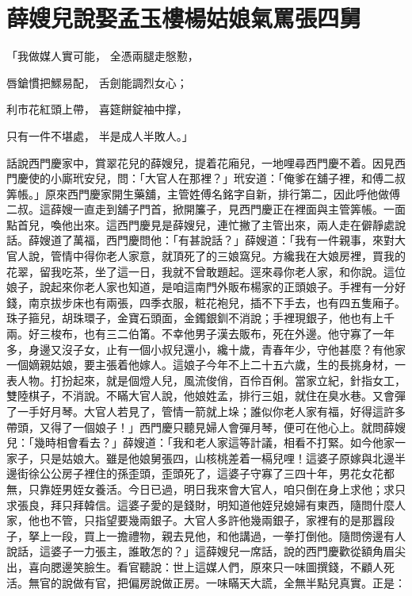 %

\chapter{薛嫂兒說娶孟玉樓\KG 楊姑娘氣罵張四舅}

「我做媒人實可能，  全憑兩腿走慇懃，

唇鎗慣把鰥易配，  舌劍能調烈女心；

利市花紅頭上帶，  喜筵餅錠袖中撑，

只有一件不堪處，  半是成人半敗人。」

話說西門慶家中，賞翠花兒的薛嫂兒，提着花廂兒，一地哩尋西門慶不着。因見西門慶使的小廝玳安兒，問：「大官人在那裡？」玳安道：「俺爹在舖子裡，和傅二叔筭帳。」原來西門慶家開生藥舖，主管姓傅名銘字自新，排行第二，因此呼他做傅二叔。這薛嫂一直走到舖子門首，掀開簾子，見西門慶正在裡面與主管筭帳。一面點首兒，喚他出來。這西門慶見是薛嫂兒，連忙撇了主管出來，兩人走在僻靜處說話。薛嫂道了萬福，西門慶問他：「有甚說話？」薛嫂道：「我有一件親事，來對大官人說，管情中得你老人家意，就頂死了的三娘窩兒。方纔我在大娘房裡，買我的花翠，留我吃茶，坐了這一日，我就不曾敢題起。逕來尋你老人家，和你說。這位娘子，說起來你老人家也知道，是咱這南門外販布楊家的正頭娘子。手裡有一分好錢，南京拔步床也有兩張，四季衣服，粧花袍兒，插不下手去，也有四五隻廂子。珠子箍兒，胡珠環子，金寶石頭面，金鐲銀釧不消說；手裡現銀子，他也有上千兩。好三梭布，也有三二伯筩。不幸他男子漢去販布，死在外邊。他守寡了一年多，身邊又沒子女，止有一個小叔兒還小，纔十歲，青春年少，守他甚麼？有他家一個嫡親姑娘，要主張着他嫁人。這娘子今年不上二十五六歲，生的長挑身材，一表人物。打扮起來，就是個燈人兒，風流俊俏，百伶百俐。當家立紀，針指女工，雙陸棋子，不消說。不瞞大官人說，他娘姓孟，排行三姐，就住在臭水巷。又會彈了一手好月琴。大官人若見了，管情一箭就上垛；誰似你老人家有福，好得這許多帶頭，又得了一個娘子！」西門慶只聽見婦人會彈月琴，便可在他心上。就問薛嫂兒：「幾時相會看去？」薛嫂道：「我和老人家這等計議，相看不打緊。如今他家一家子，只是姑娘大。雖是他娘舅張四，山核桃差着一槅兒哩！這婆子原嫁與北邊半邊街徐公公房子裡住的孫歪頭，歪頭死了，這婆子守寡了三四十年，男花女花都無，只靠姪男姪女養活。今日已過，明日我來會大官人，咱只倒在身上求他；求只求張良，拜只拜韓信。這婆子愛的是錢財，明知道他姪兒媳婦有東西，隨問什麼人家，他也不管，只指望要幾兩銀子。大官人多許他幾兩銀子，家裡有的是那囂段子，拏上一段，買上一擔禮物，親去見他，和他講過，一拳打倒他。隨問傍邊有人說話，這婆子一力張主，誰敢怎的？」這薛嫂兒一席話，說的西門慶歡從額角眉尖出，喜向腮邊笑臉生。看官聽說：世上這媒人們，原來只一味圖撰錢，不顧人死活。無官的說做有官，把偏房說做正房。一味瞞天大謊，全無半點兒真實。正是：

